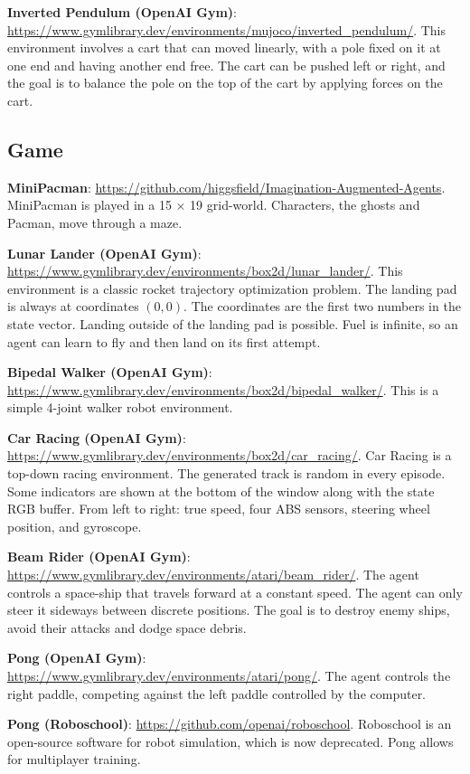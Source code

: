 \documentclass[10pt]{article} %
\theoremstyle{definition}
\begin{document}
\textbf{Inverted Pendulum (OpenAI Gym)}: \url{https://www.gymlibrary.dev/environments/mujoco/inverted_pendulum/}. This environment involves a cart that can moved linearly, with a pole fixed on it at one end and having another end free. The cart can be pushed left or right, and the goal is to balance the pole on the top of the cart by applying forces on the cart.

\subsection{Game}
\textbf{MiniPacman}: \url{https://github.com/higgsfield/Imagination-Augmented-Agents}. MiniPacman is played in a 15 × 19 grid-world. Characters, the ghosts and Pacman, move through a maze. 

\textbf{Lunar Lander (OpenAI Gym)}: \url{https://www.gymlibrary.dev/environments/box2d/lunar_lander/}. This environment is a classic rocket trajectory optimization problem. The landing pad is always at coordinates $(0,0)$. The coordinates are the first two numbers in the state vector. Landing outside of the landing pad is possible. Fuel is infinite, so an agent can learn to fly and then land on its first attempt.

\textbf{Bipedal Walker (OpenAI Gym)}: \url{https://www.gymlibrary.dev/environments/box2d/bipedal_walker/}. This is a simple 4-joint walker robot environment.

\textbf{Car Racing (OpenAI Gym)}: \url{https://www.gymlibrary.dev/environments/box2d/car_racing/}. Car Racing is a top-down racing environment. The generated track is random in every episode. Some indicators are shown at the bottom of the window along with the state RGB buffer. From left to right: true speed, four ABS sensors, steering wheel position, and gyroscope. 

\textbf{Beam Rider (OpenAI Gym)}: \url{https://www.gymlibrary.dev/environments/atari/beam_rider/}. The agent controls a space-ship that travels forward at a constant speed. The agent can only steer it sideways between discrete positions. The goal is to destroy enemy ships, avoid their attacks and dodge space debris.

\textbf{Pong (OpenAI Gym)}: \url{https://www.gymlibrary.dev/environments/atari/pong/}. The agent controls the right paddle, competing against the left paddle controlled by the computer. 

\textbf{Pong (Roboschool)}: \url{https://github.com/openai/roboschool}. Roboschool is an open-source software for robot simulation, which is now deprecated. Pong allows for multiplayer training.
\end{document}
